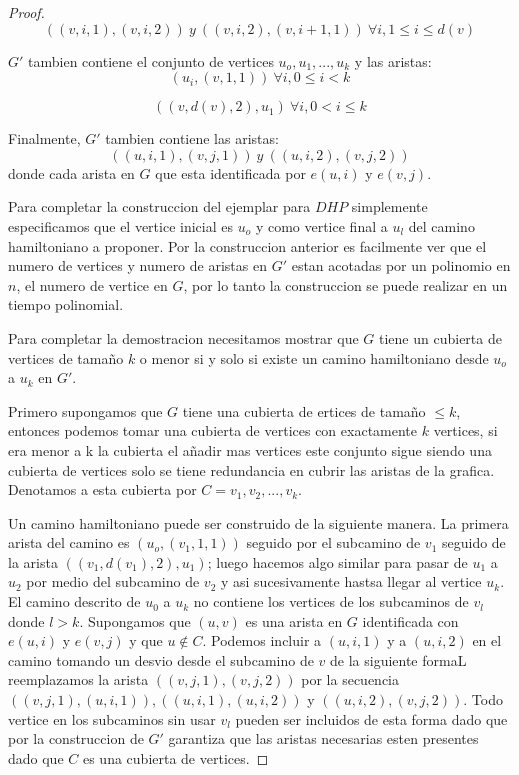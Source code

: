 \documentclass{article}
\begin{document}
\begin{proof}
  \begin{equation*}
    ((v,i,1),(v,i,2))\ y\ ((v,i,2),(v,i+1,1))\ \forall i, 1 \leqslant i \leqslant d(v)
  \end{equation*}

  $G'$ tambien contiene el conjunto de vertices ${ u_o, u_1, ..., u_k }$ y las aristas:
  \begin{equation*}
    (u_i, (v,1,1))\ \forall i, 0 \leqslant i < k
  \end{equation*}

  \begin{equation*}
    ((v,d(v),2),u_1)\ \forall i, 0 < i \leqslant k
  \end{equation*}
  
  Finalmente, $G'$ tambien contiene las aristas:
  \begin{equation*}
    ((u,i,1),(v,j,1))\ y\ ((u,i,2),(v,j,2))
  \end{equation*}
  donde cada arista en $G$ que esta identificada por $e(u,i)$ y $e(v,j)$.

  Para completar la construccion del ejemplar para $DHP$ simplemente especificamos que el vertice inicial es $u_o$ y como vertice final a $u_l$ del camino hamiltoniano a proponer. Por la construccion anterior es facilmente  ver que el numero de vertices y numero de aristas en $G'$ estan acotadas por un polinomio en $n$, el numero de vertice en $G$, por lo tanto la construccion se puede realizar en un tiempo polinomial.

  Para completar la demostracion necesitamos mostrar que $G$ tiene un cubierta de vertices de tamaño $k$ o menor si y solo si existe un camino hamiltoniano desde $u_o$ a $u_k$ en $G'$.

  Primero supongamos que $G$ tiene una cubierta de ertices de tamaño $\leqslant k$, entonces podemos tomar una cubierta de vertices con exactamente $k$ vertices, si era menor a k la cubierta el añadir mas vertices este conjunto sigue siendo una cubierta de vertices solo se tiene redundancia en cubrir las aristas de la grafica. Denotamos a esta cubierta por $C = {v_1, v_2, ..., v_k}$.

  Un camino hamiltoniano puede ser construido de la siguiente manera. La primera arista del camino es $(u_o, (v_1,1,1))$ seguido por el subcamino de $v_1$ seguido de la arista $((v_1, d(v_1),2), u_1)$; luego hacemos algo similar para pasar de $u_1$ a $u_2$ por medio del subcamino de $v_2$ y asi sucesivamente hastsa llegar al vertice $u_k$. El camino descrito de $u_0$ a $u_k$ no contiene los vertices de los subcaminos de $v_l$ donde $l > k$. Supongamos que $(u,v)$ es una arista en $G$ identificada con $e(u,i)$ y $e(v,j)$ y que $u \notin C$. Podemos incluir a $(u,i,1)$ y a $(u,i,2)$ en el camino tomando un desvio desde el subcamino de $v$ de la siguiente formaL reemplazamos la arista  $((v,j,1),(v,j,2))$ por la secuencia $((v,j,1),(u,i,1)),((u,i,1),(u,i,2))$ y $((u,i,2),(v,j,2))$. Todo vertice en los subcaminos sin usar $v_l$ pueden ser incluidos de esta forma dado que por la construccion de $G'$ garantiza que las aristas necesarias esten presentes dado que $C$ es una cubierta de vertices.


\end{proof}
\end{document}
